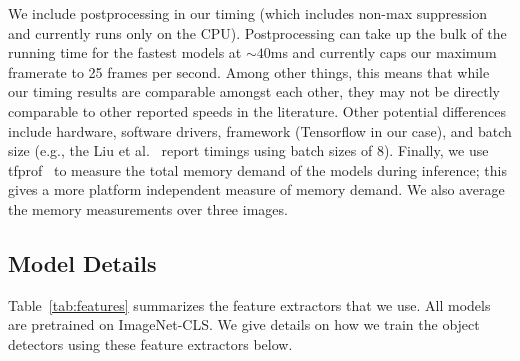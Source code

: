 \documentclass[10pt,twocolumn,letterpaper]{article}
\begin{document}
We include postprocessing in our timing (which includes non-max suppression and currently runs only on the CPU).  Postprocessing can take up the bulk of the running time for the fastest models at $\sim 40$ms and currently caps our maximum framerate to 25 frames per second.
Among other things, this means that while our timing results are comparable amongst each other, they may not be directly comparable to other reported speeds in the literature.
Other potential differences include hardware, software drivers, framework (Tensorflow in our case), and batch size (e.g., the Liu et al.~\cite{liu2015ssd} report timings using batch sizes of 8). 
Finally, we use tfprof~\cite{pan2016tfprof} to measure the total memory demand of the models during inference; this gives a more platform independent measure of memory demand. We also average the memory measurements over three images.

\subsection{Model Details}\label{sec:model_details}

    
Table~\ref{tab:features} summarizes the feature extractors that we use.
All models are pretrained on ImageNet-CLS.
We give details on how we train the object detectors using these feature extractors below.
\end{document}

